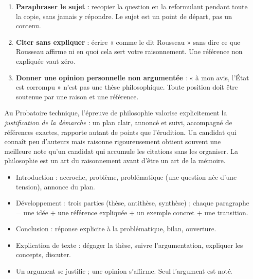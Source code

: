 \documentclass[11pt]{article}
\begin{document}
\begin{attention}
\begin{enumerate}
\item \textbf{Paraphraser le sujet} : recopier la question en la reformulant pendant toute la copie, sans jamais y répondre. Le sujet est un point de départ, pas un contenu.
\item \textbf{Citer sans expliquer} : écrire « comme le dit Rousseau » sans dire ce que Rousseau affirme ni en quoi cela sert votre raisonnement. Une référence non expliquée vaut zéro.
\item \textbf{Donner une opinion personnelle non argumentée} : « à mon avis, l'État est corrompu » n'est pas une thèse philosophique. Toute position doit être soutenue par une raison et une référence.
\end{enumerate}
\end{attention}

\begin{savaistu}
Au Probatoire technique, l'épreuve de philosophie valorise explicitement la \emph{justification de la démarche} : un plan clair, annoncé et suivi, accompagné de références exactes, rapporte autant de points que l'érudition. Un candidat qui connaît peu d'auteurs mais raisonne rigoureusement obtient souvent une meilleure note qu'un candidat qui accumule les citations sans les organiser. La philosophie est un art du raisonnement avant d'être un art de la mémoire.
\end{savaistu}

\begin{aretenir}
\begin{itemize}
\item Introduction : accroche, problème, problématique (une question née d'une tension), annonce du plan.
\item Développement : trois parties (thèse, antithèse, synthèse) ; chaque paragraphe = une idée + une référence expliquée + un exemple concret + une transition.
\item Conclusion : réponse explicite à la problématique, bilan, ouverture.
\item Explication de texte : dégager la thèse, suivre l'argumentation, expliquer les concepts, discuter.
\item Un argument se justifie ; une opinion s'affirme. Seul l'argument est noté.
\end{itemize}
\end{aretenir}
\end{document}
